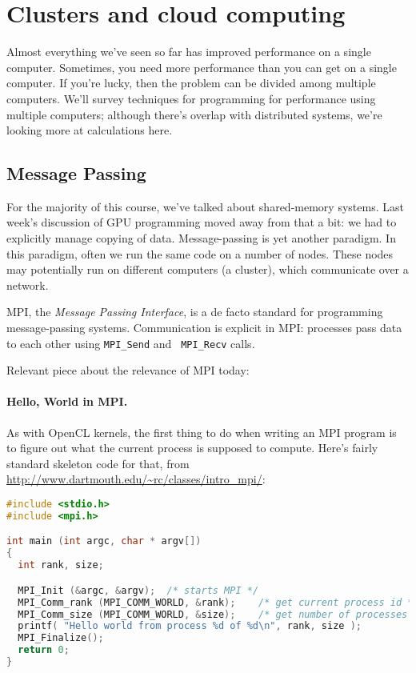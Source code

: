 




\section*{Clusters and cloud computing}
Almost everything we've seen so far has improved performance on a single
computer. Sometimes, you need more performance than you can get on a
single computer. If you're lucky, then the problem can be divided
among multiple computers. We'll survey techniques for programming for
performance using multiple computers; although there's overlap with
distributed systems, we're looking more at calculations here.

\subsection*{Message Passing} For the majority of this course, 
we've talked about shared-memory systems. Last week's discussion of
GPU programming moved away from that a bit: we had to explicitly
manage copying of data. Message-passing is yet another paradigm.  In
this paradigm, often we run the same code on a number of nodes. These
nodes may potentially run on different computers (a cluster),
which communicate over a network.

MPI, the \emph{Message Passing Interface}, is a de facto standard for
programming message-passing systems. Communication is explicit in MPI:
processes pass data to each other using {\tt MPI\_Send} and {\tt
  MPI\_Recv} calls. 

Relevant piece about the relevance of MPI today:~\cite{hpcmpi}

\paragraph{Hello, World in MPI.} As with OpenCL kernels,
the first thing to do when writing an MPI program is to
figure out what the current process is supposed to compute.
Here's fairly standard skeleton code for that,
from \url{http://www.dartmouth.edu/~rc/classes/intro_mpi/}:

{\small
\begin{lstlisting}[language=C]
#include <stdio.h>
#include <mpi.h>

int main (int argc, char * argv[])
{
  int rank, size;

  MPI_Init (&argc, &argv);	/* starts MPI */
  MPI_Comm_rank (MPI_COMM_WORLD, &rank);	/* get current process id */
  MPI_Comm_size (MPI_COMM_WORLD, &size);	/* get number of processes */
  printf( "Hello world from process %d of %d\n", rank, size );
  MPI_Finalize();
  return 0;
}
\end{lstlisting}
}

